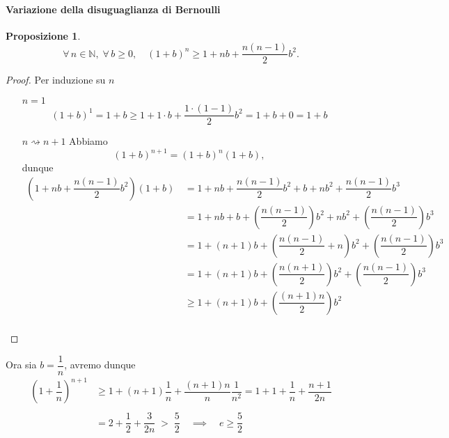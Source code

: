 \documentclass{article}
\theoremstyle{plain}
\newtheorem{prop}[thm]{Proposizione}
\theoremstyle{definition}
\theoremstyle{remark}
\begin{document}
\paragraph{Variazione della disuguaglianza di Bernoulli}
\begin{bxthm}
\begin{prop}
    \[\forall\, n\in\mathbb{N},\;\forall\, b\geq 0,\quad(1+b)^n\geq 1+nb+\frac{n(n-1)}{2}b^2.\]
\end{prop}
\end{bxthm}
\begin{proof}
    Per induzione su $n$ 
    \begin{itemize}
        \item[$n=1$]
        \[(1+b)^1 = 1+b\geq 1+1\cdot b+\frac{1\cdot(1-1)}{2}b^2 = 1+b+0 = 1+b\]
        \item[$n\rightsquigarrow n+1$]
        Abbiamo \[(1+b)^{n+1}=(1+b)^n(1+b),\] dunque 
        \begin{align*}
            \left(1+nb+\dfrac{n(n - 1)}{2}b^2\right)(1+b)&\,=1+nb+\dfrac{n(n - 1)}{2}b^2+b+nb^2+\dfrac{n(n - 1)}{2}b^3\\
            &\,=1+nb+b+\left(\dfrac{n(n-1)}{2}\right)b^2+nb^2+\left(\dfrac{n(n-1)}{2}\right)b^3\\
            &\,=1+(n+1)b+\left(\dfrac{n(n-1)}{2}+n\right)b^2+\left(\dfrac{n(n-1)}{2}\right)b^3\\
            &\,=1+(n+1)b+\left(\dfrac{n(n+1)}{2}\right)b^2+\left(\dfrac{n(n-1)}{2}\right)b^3\\
            &\,\geq1+(n+1)b+\left(\dfrac{(n+1)n}{2}\right)b^2\\
        \end{align*}
    \end{itemize}
\end{proof}

\vspace{10pt}

Ora sia $b=\dfrac{1}{n}$, avremo dunque
\begin{align*}
    \left(1+\dfrac{1}{n}\right)^{n+1}&\geq1+(n+1)\dfrac{1}{n}+\dfrac{(n+1)n}{n}\dfrac{1}{n^2}=1+1+\dfrac{1}{n}+\dfrac{n+1}{2n}\\\\
    &=2+\dfrac{1}{2}+\dfrac{3}{2n}\;>\;\dfrac{5}{2}\quad\implies\quad e\geq\dfrac{5}{2}\\
\end{align*}

\vspace{10pt}
\end{document}
